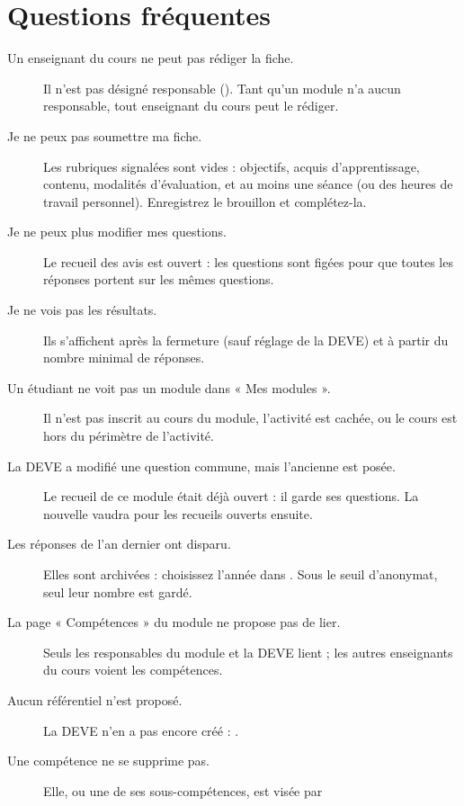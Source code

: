 \documentclass[11pt,a4paper]{article}
\begin{document}
\newpage
\part{Questions fréquentes}\label{part:faq}

\begin{description}
  \item[Un enseignant du cours ne peut pas rédiger la fiche.] Il n'est pas désigné responsable
    (). Tant qu'un module n'a aucun responsable, tout enseignant du cours
    peut le rédiger.
  \item[Je ne peux pas soumettre ma fiche.] Les rubriques signalées sont vides : objectifs,
    acquis d'apprentissage, contenu, modalités d'évaluation, et au moins une séance (ou des
    heures de travail personnel). Enregistrez le brouillon et complétez-la.
  \item[Je ne peux plus modifier mes questions.] Le recueil des avis est ouvert : les questions sont
    figées pour que toutes les réponses portent sur les mêmes questions.
  \item[Je ne vois pas les résultats.] Ils s'affichent après la fermeture (sauf réglage de la
    DEVE) et à partir du nombre minimal de réponses.
  \item[Un étudiant ne voit pas un module dans « Mes modules ».] Il n'est pas inscrit au cours
    du module, l'activité est cachée, ou le cours est hors du périmètre de l'activité.
  \item[La DEVE a modifié une question commune, mais l'ancienne est posée.] Le recueil de ce
    module était déjà ouvert : il garde ses questions. La nouvelle vaudra pour les recueils
    ouverts ensuite.
  \item[Les réponses de l'an dernier ont disparu.] Elles sont archivées : choisissez l'année
    dans . Sous le seuil d'anonymat, seul leur nombre est gardé.
  \item[La page « Compétences » du module ne propose pas de lier.] Seuls les responsables du
    module et la DEVE lient ; les autres enseignants du cours voient les compétences.
  \item[Aucun référentiel n'est proposé.] La DEVE n'en a pas encore créé : .
  \item[Une compétence ne se supprime pas.] Elle, ou une de ses sous-compétences, est visée par

\end{description}
\end{document}
